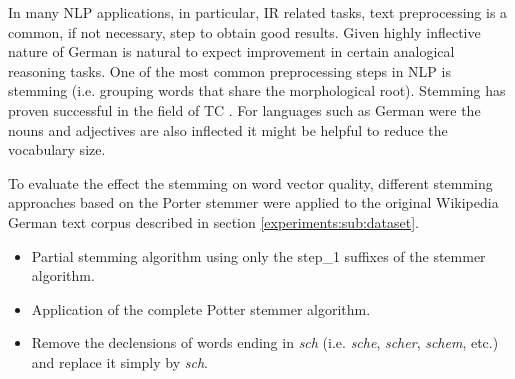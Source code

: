 In many \ac{NLP} applications, in particular, \ac{IR} related tasks,  text preprocessing is a common, if not
necessary, step to obtain good results. Given highly inflective nature of
German is natural to expect improvement in
certain analogical reasoning tasks.  One of the most common preprocessing steps in NLP is stemming (i.e. grouping
words that share the morphological root). Stemming has proven successful in
the field of \ac{TC} \cite{Sebastiani02}. For languages such as  German were the nouns and
adjectives are also inflected it might be helpful to reduce the vocabulary
size.  

To evaluate the effect the stemming on word vector quality, different
stemming approaches based on the Porter stemmer \cite{Porter80} were applied  to the original Wikipedia
German text corpus described in section \ref{experiments:sub:dataset}.

\begin{itemize} 
\item Partial stemming algorithm using only the step\_1 suffixes of the
  stemmer algorithm.
\item Application of the complete Potter stemmer algorithm.
\item Remove the declensions of words ending in  \textit{sch}  (i.e. \textit{sche}, \textit{scher},
\textit{schem}, etc.)  and replace it simply by \textit{sch}.
\end{itemize} 



